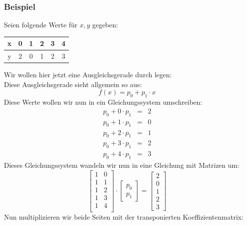 \documentclass{report}
\begin{document}
			\subsubsection{Beispiel}
				Seien folgende Werte für $x, y$ gegeben:\\
				\begin{center} \begin{tabular}{c|c|c|c|c|c}
					x & 0 & 1 & 2 & 3 & 4\\ \hline
					y & 2 & 0 & 1 & 2 & 3\\
				\end{tabular} \end{center}
				Wir wollen hier jetzt eine Ausgleichsgerade durch legen: \\Diese Ausgleichsgerade sieht allgemein so aus:
				\begin{equation*}
						f(x) = p_0 + p_1 \cdot x
				\end{equation*}
				Diese Werte wollen wir nun in ein Gleichungssystem umschreiben:
				\begin{eqnarray*}
					p_0 + 0 \cdot p_1 &=& 2 \\ 
					p_0 + 1 \cdot p_1 &=& 0 \\ 
					p_0 + 2 \cdot p_1 &=& 1 \\
					p_0 + 3 \cdot p_1 &=& 2 \\
					p_0 + 4 \cdot p_1 &=& 3
				\end{eqnarray*}
				Dieses Gleichungssystem wandeln wir nun in eine Gleichung mit Matrizen um:
				\begin{equation*}
					\begin{bmatrix}
						1 & 0 \\ 1 & 1 \\ 1 & 2 \\ 1 & 3 \\ 1 & 4 \\
					\end{bmatrix} \cdot \begin{bmatrix}
					p_0 \\ p_1
					\end{bmatrix} = \begin{bmatrix} 2 \\ 0 \\ 1 \\ 2 \\ 3 \end{bmatrix}
				\end{equation*}
				Nun multiplizieren wir beide Seiten mit der transponierten Koeffizientenmatrix:
\end{document}
